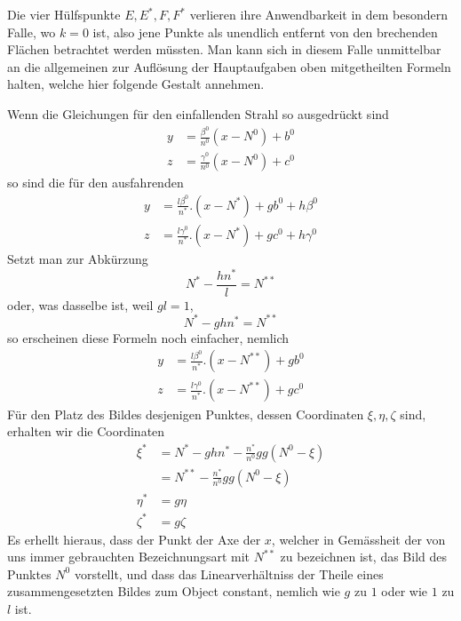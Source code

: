 Die vier Hülfspunkte $E,E^*,F,F^*$ verlieren ihre Anwendbarkeit in dem besondern Falle, wo $k=0$ ist, also jene Punkte als unendlich entfernt von den brechenden Flächen betrachtet werden müssten. Man kann sich in diesem Falle unmittelbar an die allgemeinen zur Auflösung der Hauptaufgaben oben mitgetheilten Formeln halten, welche hier folgende Gestalt annehmen.

Wenn die Gleichungen für den einfallenden Strahl so ausgedrückt sind
\[
\begin{aligned}
y&=\frac{\beta^0}{n^0}(x-N^0)+b^0\\
z&=\frac{\gamma^0}{n^0}(x-N^0)+c^0
\end{aligned}
\]
so sind die für den ausfahrenden
\[
\begin{aligned}
y&=\frac{l\beta^0}{n^*}.(x-N^*)+gb^0+h\beta^0\\
z&=\frac{l\gamma^0}{n^*}.(x-N^*)+gc^0+h\gamma^0
\end{aligned}
\]
Setzt man zur Abkürzung
\[
N^*-\frac{hn^*}{l}=N^{**}
\]
oder, was dasselbe ist, weil $gl=1$,
\[
N^*-ghn^*=N^{**}
\]
so erscheinen diese Formeln noch einfacher, nemlich
\[
\begin{aligned}
y&=\frac{l\beta^0}{n^*}.(x-N^{**})+gb^0\\
z&=\frac{l\gamma^0}{n^*}.(x-N^{**})+gc^0
\end{aligned}
\]
Für den Platz des Bildes desjenigen Punktes, dessen Coordinaten $\xi,\eta,\zeta$ sind, erhalten wir die Coordinaten
\[
\begin{aligned}
\xi^*&=N^*-ghn^*-\frac{n^*}{n^0}gg(N^0-\xi)\\
&=N^{**}-\frac{n^*}{n^0}gg(N^0-\xi)\\
\eta^*&=g\eta\\
\zeta^*&=g\zeta
\end{aligned}
\]
Es erhellt hieraus, dass der Punkt der Axe der $x$, welcher in Gemässheit der von uns immer gebrauchten Bezeichnungsart mit $N^{**}$ zu bezeichnen ist, das Bild des Punktes $N^0$ vorstellt, und dass das Linearverhältniss der Theile eines zusammengesetzten Bildes zum Object constant, nemlich wie $g$ zu $1$ oder wie $1$ zu $l$ ist.

